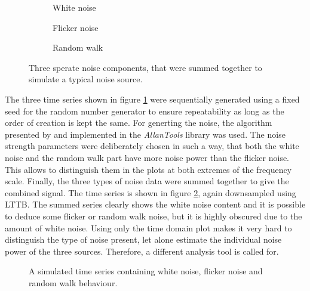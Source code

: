 \begin{figure}[ht]
    \centering
    \begin{subfigure}{0.32\linewidth}
        \centering
        \scalebox{0.75}{%
            
        } %
        \caption{White noise}
    \end{subfigure}
    \begin{subfigure}{0.32\linewidth}
        \centering
        \scalebox{0.75}{%
            
        } %
        \caption{Flicker noise}
    \end{subfigure}
    \begin{subfigure}{0.32\linewidth}
        \centering
        \scalebox{0.75}{%
            
        } %
        \caption{Random walk}
    \end{subfigure}
    \caption{Three sperate noise components, that were summed together to simulate a typical noise source.}
    \label{fig:adev_example_noise_types}
\end{figure}

The three time series shown in figure \ref{fig:adev_example_noise_types} were sequentially generated using a fixed seed for the random number generator to ensure repeatability as long as the order of creation is kept the same. For generting the noise, the algorithm presented by \citeauthor{noise_generation} \cite{noise_generation} and implemented in the \textit{AllanTools} library was used. The noise strength parameters were deliberately chosen in such a way, that both the white noise and the random walk part have more noise power than the flicker noise. This allows to distinguish them in the plots at both extremes of the frequency scale. Finally, the three types of noise data were summed together to give the combined signal. The time series is shown in figure \ref{fig:adev_example_time}, again downsampled using LTTB. The summed series clearly shows the white noise content and it is possible to deduce some flicker or random walk noise, but it is highly obscured due to the amount of white noise. Using only the time domain plot makes it very hard to distinguish the type of noise present, let alone estimate the individual noise power of the three sources. Therefore, a different analysis tool is called for.

\begin{figure}[ht]
    \centering
    
    \caption{A simulated time series containing white noise, flicker noise and random walk behaviour.}
    \label{fig:adev_example_time}
\end{figure}

